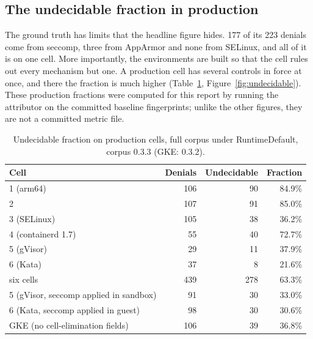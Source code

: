 \subsection{The undecidable fraction in production}
The ground truth has limits that the headline figure hides. 177 of its 223 denials come from seccomp, three from AppArmor and none from SELinux, and all of it is on one cell. More importantly, the environments are built so that the cell rules out every mechanism but one. A production cell has several controls in force at once, and there the fraction is much higher (Table~\ref{tab:undecidable}, Figure~\ref{fig:undecidable}). These production fractions were computed for this report by running the attributor on the committed baseline fingerprints; unlike the other figures, they are not a committed metric file.

\begin{table}[htbp]
\centering\small
\begin{tabular}{@{}lrrr@{}}
\toprule
\textbf{Cell} & \textbf{Denials} & \textbf{Undecidable} & \textbf{Fraction} \\
\midrule
1 (arm64) & 106 & 90 & 84.9\% \\
2 & 107 & 91 & 85.0\% \\
3 (SELinux) & 105 & 38 & 36.2\% \\
4 (containerd 1.7) & 55 & 40 & 72.7\% \\
5 (gVisor) & 29 & 11 & 37.9\% \\
6 (Kata) & 37 & 8 & 21.6\% \\
\midrule
six cells & 439 & 278 & 63.3\% \\
\midrule
5 (gVisor, seccomp applied in sandbox) & 91 & 30 & 33.0\% \\
6 (Kata, seccomp applied in guest) & 98 & 30 & 30.6\% \\
GKE (no cell-elimination fields) & 106 & 39 & 36.8\% \\
\bottomrule
\end{tabular}
\caption{Undecidable fraction on production cells, full corpus under RuntimeDefault, corpus 0.3.3 (GKE: 0.3.2).}
\label{tab:undecidable}
\end{table}

